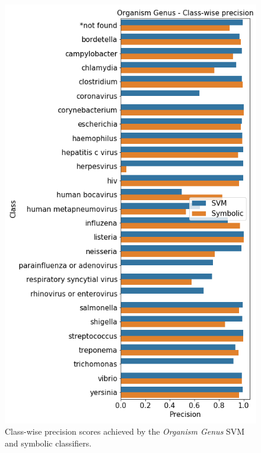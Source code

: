 \documentclass[sigconf]{acmart}
\begin{document}
\begin{figure}
    \centering
    \includegraphics[width=\linewidth]{ogc_precision.png}
    \caption{Class-wise precision scores achieved by the \textit{Organism Genus} SVM and symbolic classifiers.}
    \label{fig:ogc_precision}
\end{figure}
\end{document}
